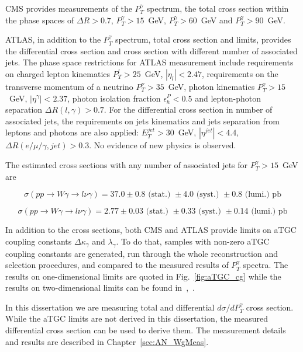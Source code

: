 CMS provides measurements of the $P_T^\gamma$ spectrum, the total cross section within the phase spaces of $\Delta R>0.7$, $P_T^\gamma>15$~GeV, $P_T^\gamma>60$~GeV and $P_T^\gamma>90$~GeV.

ATLAS, in addition to the $P_T^\gamma$ spectrum, total cross section and limits, provides the differential cross section and cross section with different number of associated jets. The phase space restrictions for ATLAS measurement include requirements on charged lepton kinematics $P_T^l>25$~GeV, $|\eta_l|<2.47$, requirements on the transverse momentum of a neutrino $P_T^\nu>35$~GeV, photon kinematics $P_T^\gamma>15$~GeV, $|\eta^\gamma|<2.37$, photon isolation fraction $\epsilon^P_h<0.5$ and lepton-photon separation $\Delta R(l,\gamma)>0.7$. For the differential cross section in number of associated jets, the requirements on jets kinematics and jets separation from leptons and photons are also applied: $E_T^{jet}>30$~GeV, $|\eta^{jet}|<4.4$, $\Delta R(e/\mu/\gamma,jet)>0.3$. No evidence of new physics is observed.

The estimated cross sections with any number of associated jets for $P_T^\gamma>15$~GeV are 

\begin{equation}
\sigma(pp\rightarrow W\gamma\rightarrow l\nu\gamma) = 37.0 \pm 0.8\text{~(stat.)~}\pm 4.0\text{~(syst.)~}\pm 0.8\text{~(lumi.)~pb}
\end{equation}

\begin{equation}
\sigma(pp\rightarrow W\gamma\rightarrow l\nu\gamma) = 2.77 \pm 0.03\text{~(stat.)~}\pm 0.33\text{~(syst.)~}\pm 0.14\text{~(lumi.)~pb}
\end{equation}


In addition to the cross sections, both CMS and ATLAS provide limits on aTGC coupling constants $\Delta \kappa_\gamma$ and $\lambda_\gamma$. To do that, samples with non-zero aTGC coupling constants are generated, run through the whole reconstruction and selection procedures, and compared to the measured results of $P_T^\gamma$ spectra. The results on one-dimensional limits are quoted in Fig.~\ref{fig:aTGC_cg} while the results on two-dimensional limits can be found in~\cite{ref_7TeV_ATLAS},~\cite{ref_7TeV_CMS}.

In this dissertation we are measuring total and differential $d\sigma/d P_T^\gamma$ cross section. While the aTGC limits are not derived in this dissertation, the measured differential cross section can be used to derive them. The measurement details and results are described in Chapter~\ref{sec:AN_WgMeas}.

